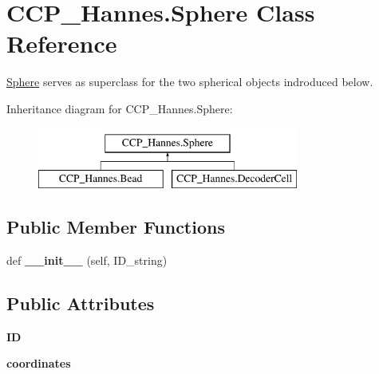\hypertarget{class_c_c_p___hannes_1_1_sphere}{}\section{C\+C\+P\+\_\+\+Hannes.\+Sphere Class Reference}
\label{class_c_c_p___hannes_1_1_sphere}


\mbox{\hyperlink{class_c_c_p___hannes_1_1_sphere}{Sphere}} serves as superclass for the two spherical objects indroduced below.  


Inheritance diagram for C\+C\+P\+\_\+\+Hannes.\+Sphere\+:\begin{figure}[H]
\begin{center}
\leavevmode
\includegraphics[height=2.000000cm]{class_c_c_p___hannes_1_1_sphere}
\end{center}
\end{figure}
\subsection*{Public Member Functions}
\begin{DoxyCompactItemize}
\item 
\mbox{\label{class_c_c_p___hannes_1_1_sphere_a5e32ac3041f6e0463acc08642656bab7}} 
def {\bfseries \+\_\+\+\_\+init\+\_\+\+\_\+} (self, I\+D\+\_\+string)
\end{DoxyCompactItemize}
\subsection*{Public Attributes}
\begin{DoxyCompactItemize}
\item 
\mbox{\label{class_c_c_p___hannes_1_1_sphere_ac8db37d29aa6499edd50cc1e6378af51}} 
{\bfseries ID}
\item 
\mbox{\label{class_c_c_p___hannes_1_1_sphere_a66c9c8500df0ede2af4705f993387733}} 
{\bfseries coordinates}
\end{DoxyCompactItemize}


